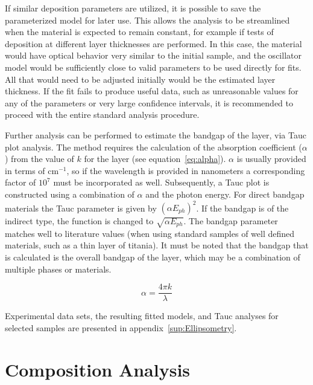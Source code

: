 If similar deposition parameters are utilized, it is possible to save the parameterized model for later use. This allows the analysis to be streamlined when the material is expected to remain constant, for example if tests of deposition at different layer thicknesses are performed. In this case, the material would have optical behavior very similar to the initial sample, and the oscillator model would be sufficiently close to valid parameters to be used directly for fits. All that would need to be adjusted initially would be the estimated layer thickness. If the fit fails to produce useful data, such as unreasonable values for any of the parameters or very large confidence intervals, it is recommended to proceed with the entire standard analysis procedure. 

Further analysis can be performed to estimate the bandgap of the layer, via Tauc plot analysis. The method requires the calculation of the absorption coefficient ($\alpha$) from the value of $k$ for the layer (see equation~\vref{eq:alpha}). $\alpha$ is usually provided in terms of cm$^{-1}$, so if the wavelength is provided in nanometers a corresponding factor of $10^{7}$ must be incorporated as well. Subsequently, a Tauc plot is constructed using a combination of $\alpha$ and the photon energy. For direct bandgap materials the Tauc parameter is given by $\left(\alpha E_{ph}\right)^{2}$. If the bandgap is of the indirect type, the function is changed to $\sqrt{\alpha E_{ph}}$. The bandgap parameter matches well to literature values (when using standard samples of well defined materials, such as a thin layer of titania). It must be noted that the bandgap that is calculated is the overall bandgap of the layer, which may be a combination of multiple phases or materials. 

\begin{equation}
	\label{eq:alpha}%
	\alpha = \frac{4\pi k}{\lambda}
\end{equation}

Experimental data sets, the resulting fitted models, and Tauc analyses for selected samples are presented in appendix~\vref{sup:Ellipsometry}.


\section{Composition Analysis}
\label{sec:Methods-Comp}

